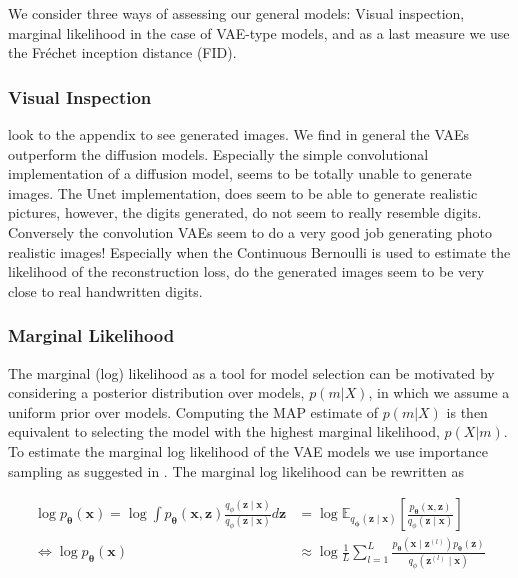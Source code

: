 We consider three ways of assessing our general models: Visual inspection, marginal likelihood in the case of VAE-type models, and as a last measure we use the Fréchet inception distance (FID). 

\subsubsection*{Visual Inspection}

look to the appendix to see generated images. We find in general the VAEs outperform the diffusion models. Especially the simple convolutional implementation of a diffusion model, seems to be totally unable to generate images. The Unet implementation, does seem to be able to generate realistic pictures, however, the digits generated, do not seem to really resemble digits. Conversely the convolution VAEs seem to do a very good job generating photo realistic images! Especially when the Continuous Bernoulli is used to estimate the likelihood of the reconstruction loss, do the generated images seem to be very close to real handwritten digits. 

\subsubsection*{Marginal Likelihood}
The marginal (log) likelihood as a tool for model selection can be motivated by considering a posterior distribution over models, $p(m|X)$, in which we assume a uniform prior over models. Computing the MAP estimate of $p(m|X)$ is then equivalent to selecting the model with the highest marginal likelihood, $p(X|m)$. To estimate the marginal log likelihood of the VAE models we use importance sampling as suggested in \cite{importancesampling}. The marginal log likelihood can be rewritten as

\begin{align}
	\nonumber
	\log p_{\bm{\theta}}(\mathbf{x}) = \log \int p_{\bm{\theta}}(\mathbf{x}, \mathbf{z})
	\frac{q_{\phi}(\mathbf{z} \mid \mathbf{x})}{q_{\phi}(\mathbf{z} \mid \mathbf{x})}
	d \mathbf{z}                                                                                      
	                                 & =
	\nonumber
	\log \mathbb{E}_{q_{\bm{\phi}}(\mathbf{z} \mid  \mathbf{x})} \left[
		\frac{
			p_{\bm{\theta}}(\mathbf{x}, \mathbf{z})
		}{q_{\phi}(\mathbf{z} \mid \mathbf{x})}
	\right]                                                                                             \\
	\label{IS-VAE}
	\Leftrightarrow
	\log p_{\bm{\theta}}(\mathbf{x}) & \approx
	\log \frac{1}{L} \sum_{l=1}^{L}
	\frac{
		p_{\bm{\theta}}(\mathbf{x} \mid  \mathbf{z}^{(l)}) p_{\bm{\theta}}(\mathbf{z})
	}{
		q_{\phi}(\mathbf{z}^{(l)} \mid \mathbf{x})
	}
\end{align}

